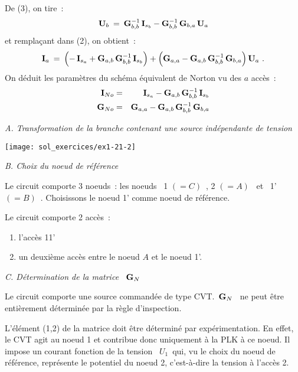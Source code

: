 De (3), on tire~:
\[ {\bf U}_{b} \: = \: {\bf G}^{-1}_{b,b} \, {\bf I}_{s_{b}} 
- {\bf G}^{-1}_{b,b} \, {\bf G}_{b,a} \, {\bf U}_a \]
et remplaçant dans (2), on obtient~:
\[ {\bf I}_a\: = \: 
\left( -\, {\bf I}_{s_a} + {\bf G}_{a,b} \, {\bf G}^{-1}_{b,b} \, 
{\bf I}_{s_{b}} \right)
+ \left( {\bf G}_{a,a} - {\bf G}_{a,b} \, {\bf G}^{-1}_{b,b} \, 
{\bf G}_{b,a} \right) {\bf U}_a~.\]
On déduit les paramètres du schéma équivalent de Norton vu des $a$ accès~:
\begin{eqnarray*}
{\bf I}_{No} &=& {\bf I}_{s_a} - {\bf G}_{a,b} \, {\bf G}^{-1}_{b,b} \, {\bf I}_{s_{b}} \\
{\bf G}_{No} &=& {\bf G}_{a,a} - {\bf G}_{a,b} \, {\bf G}^{-1}_{b,b} \, {\bf G}_{b,a} 
\end{eqnarray*}


{\em A. Transformation de la branche contenant une source indépendante de tension}

\begin{center}
\texttt{[image: sol\_exercices/ex1-21-2]}
\end{center}


{\em B. Choix du noeud de référence}

Le circuit comporte 3 noeuds~: les noeuds \ 1 $(=C)$~, 2 $(=A)$ \ et \  1' $(=B)$~.
Choisissons le noeud 1' comme noeud de référence. 

Le circuit comporte 2 accès~:
\begin{enumerate}
\item l'accès 11'
\item un deuxième accès entre le noeud  $A$  et le noeud  1'.
\end{enumerate}

{\em C. Détermination de la matrice \ ${\bf G}_N$}

Le circuit comporte une source commandée de type CVT.\ ${\bf G}_N$ \ ne
peut être entièrement déterminée par la règle d'inspection.

L'élément (1,2) de la matrice doit être déterminé par
expérimentation. En effet, le CVT agit au noeud 1 et contribue donc
uniquement à la PLK à ce noeud. Il impose un courant fonction de la
tension \ $U_1$\ qui, vu le choix du noeud de référence, représente le
potentiel du noeud 2, c'est-à-dire la tension à l'accès 2.

